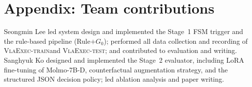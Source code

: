 \documentclass{article}
\newcommand{\datasettrain}{\textsc{VlaExec-train}}
\newcommand{\datasettest}{\textsc{VlaExec-test}}
\begin{document}



\newpage
\appendix

\section{Appendix: Team contributions}

Seongmin Lee led system design and implemented the Stage~1 FSM trigger
and the rule-based pipeline (Rule$+G_0$); performed all data collection
and recording of \datasettrain and \datasettest; and contributed to
evaluation and writing.
Sanghyuk Ko designed and implemented the Stage~2 evaluator, including
LoRA fine-tuning of Molmo-7B-D, counterfactual augmentation strategy,
and the structured JSON decision policy; led ablation analysis and
paper writing.
\end{document}
